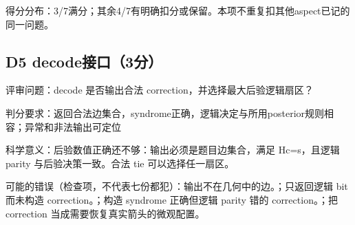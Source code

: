\documentclass[11pt,a4paper]{article}
\begin{document}
得分分布：3/7满分；其余4/7有明确扣分或保留。本项不重复扣其他aspect已记的同一问题。

\clearpage
\subsection{D5 decode接口（3分）}
\label{aspect:D5}
评审问题：decode 是否输出合法 correction，并选择最大后验逻辑扇区？

判分要求：返回合法边集合，syndrome正确，逻辑决定与所用posterior规则相容；异常和非法输出可定位

科学意义：后验数值正确还不够：输出必须是题目边集合，满足 Hc=s，且逻辑 parity 与后验决策一致。合法 tie 可以选择任一扇区。

可能的错误（检查项，不代表七份都犯）：输出不在几何中的边。；只返回逻辑 bit 而未构造 correction。；构造 syndrome 正确但逻辑 parity 错的 correction。；把 correction 当成需要恢复真实箭头的微观配置。
\end{document}
